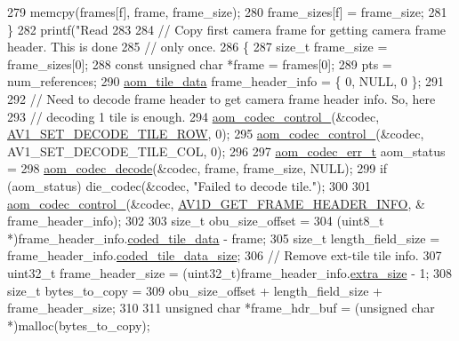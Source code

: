 \begin{DoxyCodeInclude}
{{{{{279     memcpy(frames[f], frame, frame\_size);
280     frame\_sizes[f] = frame\_size;
281   \}
282   printf(\textcolor{stringliteral}{"Read %
283 
284   \textcolor{comment}{// Copy first camera frame for getting camera frame header. This is done}
285   \textcolor{comment}{// only once.}
286   \{
287     \textcolor{keywordtype}{size\_t} frame\_size = frame\_sizes[0];
288     \textcolor{keyword}{const} \textcolor{keywordtype}{unsigned} \textcolor{keywordtype}{char} *frame = frames[0];
289     pts = num\_references;
290     \hyperlink{structaom__tile__data}{aom\_tile\_data} frame\_header\_info = \{ 0, NULL, 0 \};
291 
292     \textcolor{comment}{// Need to decode frame header to get camera frame header info. So, here}
293     \textcolor{comment}{// decoding 1 tile is enough.}
294     \hyperlink{group__codec_ga51eb332a40dcacc39000ab8e0be36b79}{aom\_codec\_control\_}(&codec, \hyperlink{group__aom__decoder_gga3865fd4b3192489baa9a5c3632ebe97bac056b4cf80427fd05e3c4c9fc46edb78}{AV1\_SET\_DECODE\_TILE\_ROW}, 0);
295     \hyperlink{group__codec_ga51eb332a40dcacc39000ab8e0be36b79}{aom\_codec\_control\_}(&codec, AV1\_SET\_DECODE\_TILE\_COL, 0);
296 
297     \hyperlink{group__codec_gaaae61e0f8663e6137f1e228757248e7c}{aom\_codec\_err\_t} aom\_status =
298         \hyperlink{group__decoder_gab03fdb999d1f83a5896869a3ba5f68f7}{aom\_codec\_decode}(&codec, frame, frame\_size, NULL);
299     \textcolor{keywordflow}{if} (aom\_status) die\_codec(&codec, \textcolor{stringliteral}{"Failed to decode tile."});
300 
301     \hyperlink{group__codec_ga51eb332a40dcacc39000ab8e0be36b79}{aom\_codec\_control\_}(&codec, \hyperlink{group__aom__decoder_gga3865fd4b3192489baa9a5c3632ebe97baed16ed4514ea1bd2847e607ca880b246}{AV1D\_GET\_FRAME\_HEADER\_INFO}, &
      frame\_header\_info);
302 
303     \textcolor{keywordtype}{size\_t} obu\_size\_offset =
304         (uint8\_t *)frame\_header\_info.\hyperlink{structaom__tile__data_a05898249ddaf5ba799dd471113b0e51e}{coded\_tile\_data} - frame;
305     \textcolor{keywordtype}{size\_t} length\_field\_size = frame\_header\_info.\hyperlink{structaom__tile__data_a4451b0bcd81b4959484745df35a9fbba}{coded\_tile\_data\_size};
306     \textcolor{comment}{// Remove ext-tile tile info.}
307     uint32\_t frame\_header\_size = (uint32\_t)frame\_header\_info.\hyperlink{structaom__tile__data_a936851e515bcea0af38d2d091f5adf65}{extra\_size} - 1;
308     \textcolor{keywordtype}{size\_t} bytes\_to\_copy =
309         obu\_size\_offset + length\_field\_size + frame\_header\_size;
310 
311     \textcolor{keywordtype}{unsigned} \textcolor{keywordtype}{char} *frame\_hdr\_buf = (\textcolor{keywordtype}{unsigned} \textcolor{keywordtype}{char} *)malloc(bytes\_to\_copy);
}}}}}}
\end{DoxyCodeInclude}
